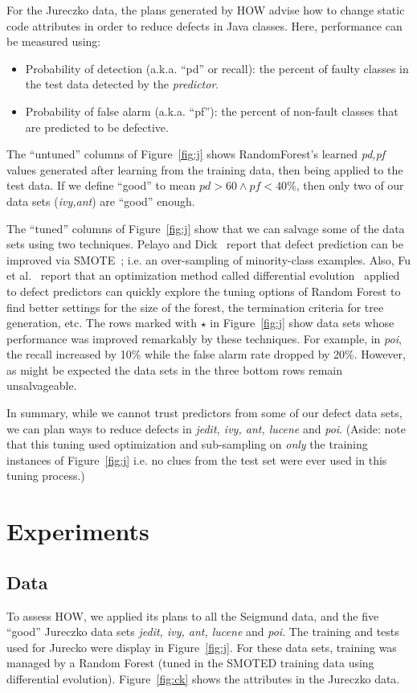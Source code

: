 \documentclass[conference]{IEEEtran}
\newcommand{\bi}{\begin{itemize}}
\newcommand{\ei}{\end{itemize}}
\newcommand{\fig}[1]{Figure~\ref{fig:#1}}
\begin{document}
For the  Jureczko   data,
the plans generated by HOW advise   how to change static code attributes in order to reduce defects in
Java classes.  Here,
performance can be measured using:
\bi
\item Probability of detection (a.k.a. ``pd'' or recall):  the percent of faulty classes in
the test data detected
by the {\em predictor}.
\item Probability of false alarm (a.k.a. ``pf''): the percent of non-fault
classes that are predicted to be defective.
\ei 
The ``untuned'' columns of \fig{j} shows RandomForest's learned {\em pd,pf}
values generated after learning from the training data, then being applied to the test data.
If we define ``good'' to mean $\mathit{pd}>60 \wedge \mathit{pf} < 40$\%,
then only two of our data sets ({\em ivy,ant}) are ``good'' enough. 

The ``tuned'' columns of \fig{j} show that we can salvage some of the data sets
using two techniques.
 Pelayo and Dick~\cite{pelayo07} report that defect prediction can be improved via SMOTE~\cite{Chawla2002}; i.e. an over-sampling of minority-class examples.
 Also, Fu et al.~\cite{fu:ase15} report that an optimization method called differential evolution~\cite{storn97}
applied to defect predictors can quickly explore the tuning
options of Random Forest to find better settings for the size of the forest, the termination criteria
for tree generation, etc.
The rows marked with $\star$ in \fig{j} show data sets whose performance was improved remarkably by these
techniques. For example, in {\em poi}, the recall increased by 10\% while the false alarm rate dropped by 20\%.
However,  as might be expected
the data sets in the  three bottom rows remain
unsalvageable.

In summary, while we cannot trust predictors from some of our defect data sets,
we can plan ways to reduce defects in {\em jedit, ivy, ant, lucene} and {\em poi}.
(Aside: note that this tuning used optimization and sub-sampling   on   {\em only} the
training instances of \fig{j}
i.e.
no clues from the test set were ever used in this tuning process.)


 

\section{Experiments}

\subsection{Data}
To assess HOW, we applied its plans to all the Seigmund data, and the five ``good''
  Jureczko   data sets {\em jedit, ivy, ant, lucene} and {\em poi}.
  The training and tests used for Jurecko were display in \fig{j}. For these data
  sets, training was managed by a Random Forest (tuned in the SMOTED training data using differential
  evolution). \fig{ck} shows the attributes in the Jureczko data.
  
\end{document}
